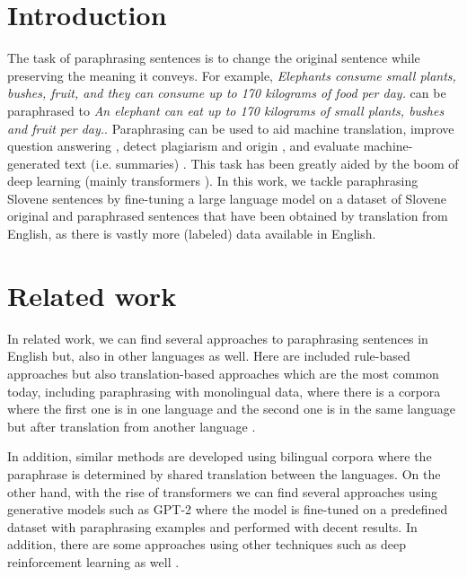 \documentclass[fleqn,moreauthors,10pt]{ds_report}
\affiliation{\textsuperscript{1}\textit{dp8949@student.uni-lj.si, 63180224} \textsuperscript{2}\textit{it8816@student.uni-lj.si, 63180383} \textsuperscript{3}\textit{kv4582@student.uni-lj.si, 63190317}}
\begin{document}
\flushbottom

\maketitle

\thispagestyle{empty}


\section*{Introduction}
The task of paraphrasing sentences is to change the original sentence while preserving the meaning it conveys. For example, \textit{Elephants consume small plants, bushes, fruit, and they can consume up to 170 kilograms of food per day.} can be paraphrased to \textit{An elephant can eat up to 170 kilograms of small plants, bushes and fruit per day.}. Paraphrasing can be used to aid machine translation, improve question answering \cite{paraphrasingtoimproveqa}, detect plagiarism and origin \cite{paraphrasestodetectorigin}, and evaluate machine-generated text (i.e. summaries) \cite{paraphrasestoevaluatetext}. This task has been greatly aided by the boom of deep learning (mainly transformers \cite{vaswani2017attention}). In this work, we tackle paraphrasing Slovene sentences by fine-tuning a large language model on a dataset of Slovene original and paraphrased sentences that have been obtained by translation from English, as there is vastly more (labeled) data available in English. 

\section*{Related work}
In related work, we can find several approaches to paraphrasing sentences in English but, also in other languages as well. Here are included rule-based approaches \cite{mckeown-1979-paraphrasing} but also translation-based approaches which are the most common today, including paraphrasing with monolingual data, where there is a corpora where the first one is in one language and the second one is in the same language but after translation from another language \cite{10.3115/1073012.1073020}.
\par
In addition, similar methods are developed using bilingual corpora \cite{mallinson-etal-2017-paraphrasing} where the paraphrase is determined by shared translation between the languages. On the other hand, with the rise of transformers \cite{vaswani2017attention} we can find several approaches using generative models such as GPT-2 \cite{DBLP:journals/corr/abs-1911-09661} where the model is fine-tuned on a predefined dataset with paraphrasing examples and performed with decent results. In addition, there are some approaches using other techniques such as deep reinforcement learning as well \cite{li-etal-2018-paraphrase}.
\end{document}
